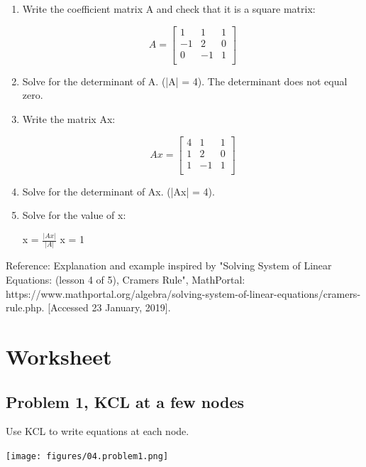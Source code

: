 \documentclass[11pt]{book}
\begin{document}
\begin{enumerate}
	\item Write the coefficient matrix A and check that it is a square matrix:
		\begin{center}
		\[
  		A=
  		\left[ {\begin{array}{ccc}
   		1 & 1 & 1\\
   		-1 & 2 & 0\\
   		0 & -1 & 1\\
  		\end{array} } \right]
		\]
		\end{center}
	\item Solve for the determinant of A. (|A| = 4). The determinant does not equal zero.
	\item Write the matrix Ax:
		\begin{center}
		\[
  		Ax=
  		\left[ {\begin{array}{ccc}
   		4 & 1 & 1\\
   		1 & 2 & 0\\
   		1 & -1 & 1\\
  		\end{array} } \right]
		\]
		\end{center}
	\item Solve for the determinant of Ax. (|Ax| = 4). 
	\item Solve for the value of x:
		\begin{center}
		x = $\frac{|Ax|}{|A|}$
		x = 1
		\end{center}
\end{enumerate}

Reference: Explanation and example inspired by "Solving System of Linear Equations: (lesson 4 of 5), Cramers Rule", MathPortal: https://www.mathportal.org/algebra/solving-system-of-linear-equations/cramers-rule.php. [Accessed 23 January, 2019].


\newpage

\section{Worksheet}
\subsection{Problem 1, KCL at a few nodes}
Use KCL to write equations at each node.
\begin{center}
	\texttt{[image: figures/04.problem1.png]}
\end{center}
\end{document}
